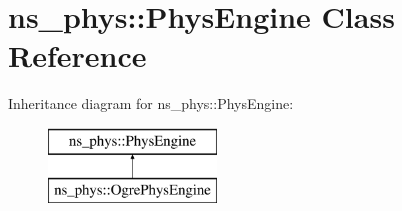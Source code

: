 \hypertarget{classns__phys_1_1_phys_engine}{}\section{ns\+\_\+phys\+:\+:Phys\+Engine Class Reference}
\label{classns__phys_1_1_phys_engine}
Inheritance diagram for ns\+\_\+phys\+:\+:Phys\+Engine\+:\begin{figure}[H]
\begin{center}
\leavevmode
\includegraphics[height=2.000000cm]{classns__phys_1_1_phys_engine}
\end{center}
\end{figure}
